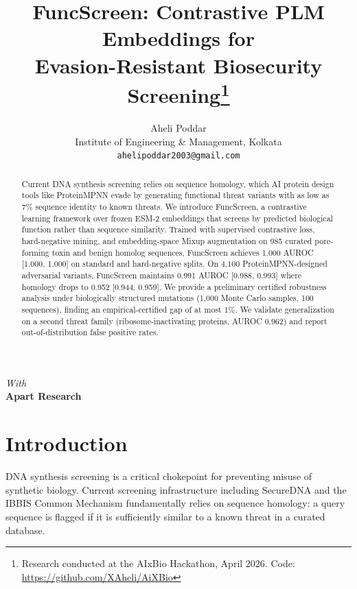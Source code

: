 \documentclass[11pt,a4paper]{article}
\title{\textbf{FuncScreen: Contrastive PLM Embeddings for\\ Evasion-Resistant Biosecurity Screening}\footnote{Research conducted at the AIxBio Hackathon, April 2026. Code: \url{https://github.com/XAheli/AiXBio}}}
\author{
    Aheli Poddar\\
    Institute of Engineering \& Management, Kolkata\\
    \texttt{ahelipoddar2003@gmail.com}
}
\date{}
\begin{document}
\maketitle

\begin{center}
    \textit{With}\\
    \textbf{Apart Research}
\end{center}

\vspace{0.5em}

\begin{abstract}
Current DNA synthesis screening relies on sequence homology, which AI protein design tools like ProteinMPNN evade by generating functional threat variants with as low as 7\% sequence identity to known threats. We introduce FuncScreen, a contrastive learning framework over frozen ESM-2 embeddings that screens by predicted biological function rather than sequence similarity. Trained with supervised contrastive loss, hard-negative mining, and embedding-space Mixup augmentation on 985 curated pore-forming toxin and benign homolog sequences, FuncScreen achieves 1.000 AUROC [1.000, 1.000] on standard and hard-negative splits. On 4,100 ProteinMPNN-designed adversarial variants, FuncScreen maintains 0.991 AUROC [0.988, 0.993] where homology drops to 0.952 [0.944, 0.959]. We provide a preliminary certified robustness analysis under biologically structured mutations (1,000 Monte Carlo samples, 100 sequences), finding an empirical-certified gap of at most 1\%. We validate generalization on a second threat family (ribosome-inactivating proteins, AUROC 0.962) and report out-of-distribution false positive rates.
\end{abstract}

\section{Introduction}

DNA synthesis screening is a critical chokepoint for preventing misuse of synthetic biology. Current screening infrastructure including SecureDNA \cite{securedna2024} and the IBBIS Common Mechanism \cite{ibbis2024} fundamentally relies on sequence homology: a query sequence is flagged if it is sufficiently similar to a known threat in a curated database.
\end{document}
